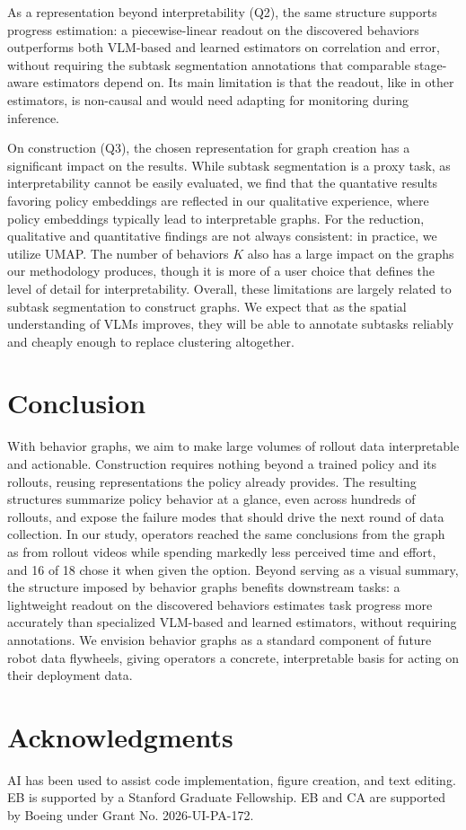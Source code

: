 \documentclass[letterpaper, 10 pt, conference]{ieeeconf}
\begin{document}
As a representation beyond interpretability (Q2), the same structure supports progress estimation: a piecewise-linear readout on the discovered behaviors outperforms both VLM-based and learned estimators on correlation and error, without requiring the subtask segmentation annotations that comparable stage-aware estimators depend on. Its main limitation is that the readout, like in other estimators, is non-causal and would need adapting for monitoring during inference.
 
On construction (Q3), the chosen representation for graph creation has a significant impact on the results. While subtask segmentation is a proxy task, as interpretability cannot be easily evaluated, we find that the quantative results favoring policy embeddings are reflected in our qualitative experience, where policy embeddings typically lead to interpretable graphs. For the reduction, qualitative and quantitative findings are not always consistent: in practice, we utilize UMAP. The number of behaviors \(K\) also has a large impact on the graphs our methodology produces, though it is more of a user choice that defines the level of detail for interpretability. Overall, these limitations are largely related to subtask segmentation to construct graphs. We expect that as the spatial understanding of VLMs improves, they will be able to annotate subtasks reliably and cheaply enough to replace clustering altogether.

\section{Conclusion}

With behavior graphs, we aim to make large volumes of rollout data interpretable and actionable. Construction requires nothing beyond a trained policy and its rollouts, reusing representations the policy already provides. The resulting structures summarize policy behavior at a glance, even across hundreds of rollouts, and expose the failure modes that should drive the next round of data collection. In our study, operators reached the same conclusions from the graph as from rollout videos while spending markedly less perceived time and effort, and 16 of 18 chose it when given the option. Beyond serving as a visual summary, the structure imposed by behavior graphs benefits downstream tasks: a lightweight readout on the discovered behaviors estimates task progress more accurately than specialized VLM-based and learned estimators, without requiring annotations. We envision behavior graphs as a standard component of future robot data flywheels, giving operators a concrete, interpretable basis for acting on their deployment data.

\section*{Acknowledgments}
AI has been used to assist code implementation, figure creation, and text editing.
EB is supported by a Stanford Graduate Fellowship.
EB and CA are supported by Boeing under Grant No. 2026-UI-PA-172.



\end{document}
